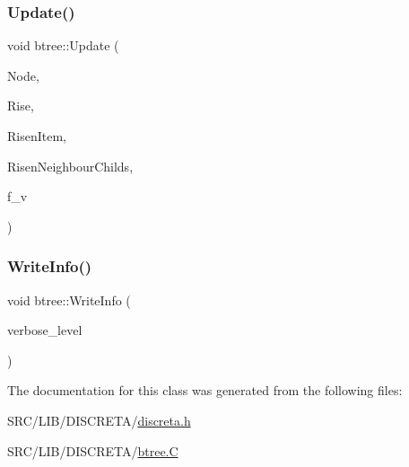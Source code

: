 \mbox{\label{classbtree_a5fd6cd5d72e9d16acbe1f914b4b46ef0}} 
\subsubsection{\texorpdfstring{Update()}{Update()}}
{\footnotesize\ttfamily void btree\+::\+Update (\begin{DoxyParamCaption}\item[{\mbox{\hyperlink{galois_8h_a09fddde158a3a20bd2dcadb609de11dc}{I\+NT}}}]{Node,  }\item[{\mbox{\hyperlink{galois_8h_a09fddde158a3a20bd2dcadb609de11dc}{I\+NT}} $\ast$}]{Rise,  }\item[{\mbox{\hyperlink{discreta_8h_a2fdd526928017b3784ac2ea203f31011}{Item\+Typ}} $\ast$}]{Risen\+Item,  }\item[{\mbox{\hyperlink{galois_8h_a09fddde158a3a20bd2dcadb609de11dc}{I\+NT}} $\ast$}]{Risen\+Neighbour\+Childs,  }\item[{\mbox{\hyperlink{galois_8h_a09fddde158a3a20bd2dcadb609de11dc}{I\+NT}}}]{f\+\_\+v }\end{DoxyParamCaption})}

\mbox{\label{classbtree_a4a8cdbdf67d06dc6caa53f3a9c83706a}} 
\subsubsection{\texorpdfstring{Write\+Info()}{WriteInfo()}}
{\footnotesize\ttfamily void btree\+::\+Write\+Info (\begin{DoxyParamCaption}\item[{\mbox{\hyperlink{galois_8h_a09fddde158a3a20bd2dcadb609de11dc}{I\+NT}}}]{verbose\+\_\+level }\end{DoxyParamCaption})}



The documentation for this class was generated from the following files\+:\begin{DoxyCompactItemize}
\item 
S\+R\+C/\+L\+I\+B/\+D\+I\+S\+C\+R\+E\+T\+A/\mbox{\hyperlink{discreta_8h}{discreta.\+h}}\item 
S\+R\+C/\+L\+I\+B/\+D\+I\+S\+C\+R\+E\+T\+A/\mbox{\hyperlink{btree_8_c}{btree.\+C}}\end{DoxyCompactItemize}
